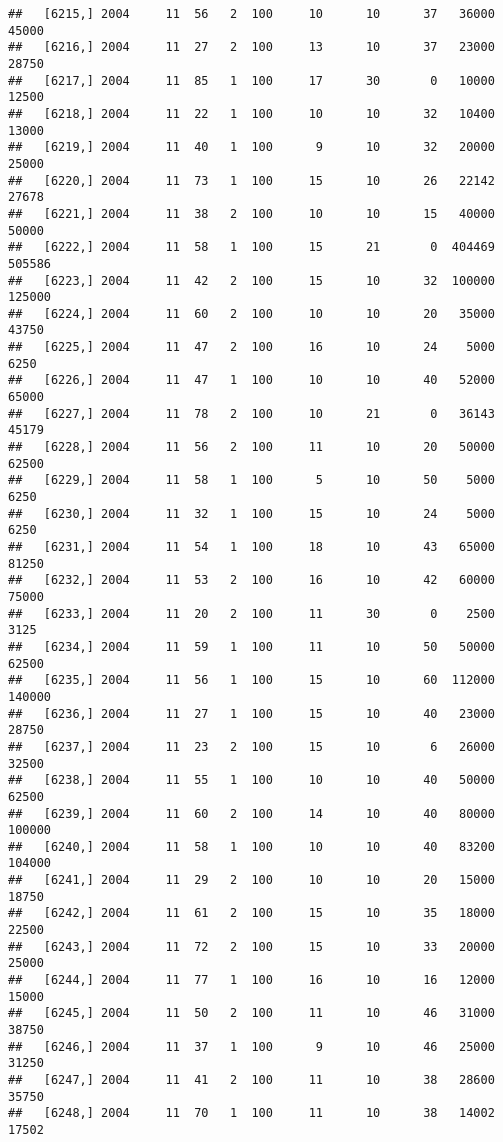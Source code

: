 \documentclass{article}\usepackage[]{graphicx}\usepackage[]{color}
\makeatletter
\newenvironment{kframe}{%
 \def\at@end@of@kframe{}%
 \ifinner\ifhmode%
  \def\at@end@of@kframe{\end{minipage}}%
  \begin{minipage}{\columnwidth}%
 \fi\fi%
 \def\FrameCommand##1{\hskip\@totalleftmargin \hskip-\fboxsep
 \colorbox{shadecolor}{##1}\hskip-\fboxsep
     \hskip-\linewidth \hskip-\@totalleftmargin \hskip\columnwidth}%
 \MakeFramed {\advance\hsize-\width
   \@totalleftmargin\z@ \linewidth\hsize
   \@setminipage}}%
 {\par\unskip\endMakeFramed%
 \at@end@of@kframe}
\newenvironment{knitrout}{}{} %
\makeatother
\begin{document}
\begin{knitrout}
\begin{kframe}
\begin{verbatim}
##   [6215,] 2004     11  56   2  100     10      10      37   36000   45000
##   [6216,] 2004     11  27   2  100     13      10      37   23000   28750
##   [6217,] 2004     11  85   1  100     17      30       0   10000   12500
##   [6218,] 2004     11  22   1  100     10      10      32   10400   13000
##   [6219,] 2004     11  40   1  100      9      10      32   20000   25000
##   [6220,] 2004     11  73   1  100     15      10      26   22142   27678
##   [6221,] 2004     11  38   2  100     10      10      15   40000   50000
##   [6222,] 2004     11  58   1  100     15      21       0  404469  505586
##   [6223,] 2004     11  42   2  100     15      10      32  100000  125000
##   [6224,] 2004     11  60   2  100     10      10      20   35000   43750
##   [6225,] 2004     11  47   2  100     16      10      24    5000    6250
##   [6226,] 2004     11  47   1  100     10      10      40   52000   65000
##   [6227,] 2004     11  78   2  100     10      21       0   36143   45179
##   [6228,] 2004     11  56   2  100     11      10      20   50000   62500
##   [6229,] 2004     11  58   1  100      5      10      50    5000    6250
##   [6230,] 2004     11  32   1  100     15      10      24    5000    6250
##   [6231,] 2004     11  54   1  100     18      10      43   65000   81250
##   [6232,] 2004     11  53   2  100     16      10      42   60000   75000
##   [6233,] 2004     11  20   2  100     11      30       0    2500    3125
##   [6234,] 2004     11  59   1  100     11      10      50   50000   62500
##   [6235,] 2004     11  56   1  100     15      10      60  112000  140000
##   [6236,] 2004     11  27   1  100     15      10      40   23000   28750
##   [6237,] 2004     11  23   2  100     15      10       6   26000   32500
##   [6238,] 2004     11  55   1  100     10      10      40   50000   62500
##   [6239,] 2004     11  60   2  100     14      10      40   80000  100000
##   [6240,] 2004     11  58   1  100     10      10      40   83200  104000
##   [6241,] 2004     11  29   2  100     10      10      20   15000   18750
##   [6242,] 2004     11  61   2  100     15      10      35   18000   22500
##   [6243,] 2004     11  72   2  100     15      10      33   20000   25000
##   [6244,] 2004     11  77   1  100     16      10      16   12000   15000
##   [6245,] 2004     11  50   2  100     11      10      46   31000   38750
##   [6246,] 2004     11  37   1  100      9      10      46   25000   31250
##   [6247,] 2004     11  41   2  100     11      10      38   28600   35750
##   [6248,] 2004     11  70   1  100     11      10      38   14002   17502

\end{verbatim}
\end{kframe}
\end{knitrout}
\end{document}
